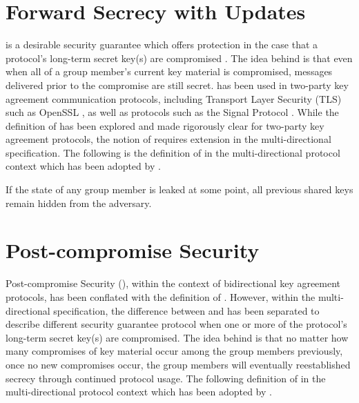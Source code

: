 \hypertarget{sec:forward-secrecy-with-updates}{%
\section{Forward Secrecy with Updates}\label{sec:forward-secrecy-with-updates}}

 is a desirable security guarantee which offers protection in the case that a protocol's long-term secret key(s) are compromised \autocite{boyd2021modern}.
The idea behind  is that even when all of a group member's current key material is compromised, messages delivered prior to the compromise are still secret.
 has been used in two-party key agreement communication protocols, including Transport Layer Security (TLS) \autocite{rfc2246, rfc4346, rfc5246, rfc8446} such as OpenSSL \autocite{openssl}, as well as  protocols such as the Signal Protocol \autocite{cohn2020formal}.
While the definition of  has been explored and made rigorously clear for two-party key agreement protocols, the notion of  requires extension in the multi-directional  specification.
The following is the definition of  in the multi-directional protocol context \autocite{alwen2020security} which has been adopted by .

\begin{definition}
If the state of any group member is leaked at some point, all previous shared keys remain hidden from the adversary.
\end{definition}


\hypertarget{sec:post-compromise-security}{%
\section{Post-compromise Security}\label{sec:post-compromise-security}}

Post-compromise Security (), within the context of bidirectional key agreement protocols, has been conflated with the definition of .
However, within the multi-directional  specification, the difference between  and  has been separated to describe different security guarantee protocol when one or more of the protocol's long-term secret key(s) are compromised.
The idea behind  is that no matter how many compromises of key material occur among the group members previously, once no new compromises occur, the group members will eventually reestablished secrecy through continued protocol usage.
The following definition of  in the multi-directional protocol context \autocite{alwen2020security} which has been adopted by .

